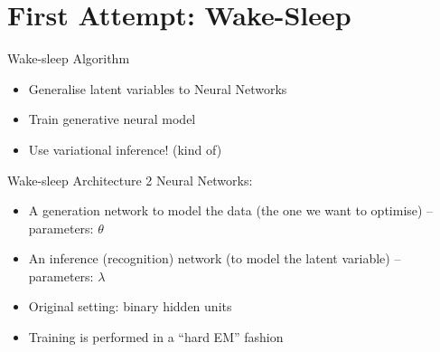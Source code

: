 \documentclass[14pt]{beamer}
\begin{document}


\section{First Attempt: Wake-Sleep}
\frame{\tableofcontents[currentsection]}

\begin{frame}{Wake-sleep Algorithm}
\begin{itemize}
\item Generalise latent variables to Neural Networks
\item Train generative neural model
\item Use variational inference! (kind of)
\end{itemize}
\end{frame}

\begin{frame}{Wake-sleep Architecture}
2 Neural Networks:
\begin{itemize}
\pause
\item A generation network to model the data (the one we want to optimise) -- parameters: $ \theta $
\pause
\item An inference (recognition) network (to model the latent variable) -- parameters: $ \lambda $
\pause
\item Original setting: binary hidden units
\pause
\item Training is performed in a ``hard EM'' fashion
\end{itemize}
\end{frame}
\end{document}
